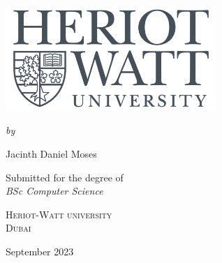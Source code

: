 \documentclass[12pt,a4paper]{report}
\author{Jacinth Daniel Moses}
\begin{document}
\begin{titlepage}
    \begin{center}
    \begin{spacing}{1.8}
    {\Large\bfseries\MakeUppercase{}}\\
    \end{spacing}
    
    \vspace{40pt}\par
    \includegraphics[width=8cm]{Figures/HWlOGO.png}
    \vspace{40pt}\par
    {\itshape\fontsize{15.5pt}{19pt}\selectfont by\\}\vspace{15pt}\par
    {\Large Jacinth Daniel Moses}\vspace{55pt}\par
    {\large Submitted for the degree of \\ \vspace{8pt} \Large\slshape{BSc Computer Science}\\}
    \vspace{35pt}\par
    {\scshape{} Heriot-Watt university\\ Dubai}
    \vspace{50pt}\par
    {\large September 2023}
    \end{center}
\end{titlepage}

%
%
%

\tableofcontents
\clearpage

\clearpage

%


\end{document}
